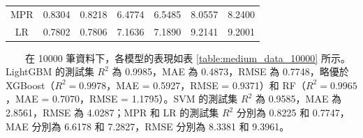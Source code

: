 \documentclass[12pt,a4paper]{article}
\begin{document}
\begin{enumerate}
\begin{enumerate}[label=\arabic*.]
\begin{enumerate}[label=3-2-\arabic*.]
\begin{enumerate}[label=\Alph*.]
\begin{table}[H]
\begin{tabular}{|c|c|c|c|c|c|c|}
                                MPR & 0.8304 & 0.8218 & 6.4774 & 6.5485 & 8.0557 & 8.2400 \\
                                LR & 0.7802 & 0.7806 & 7.1636 & 7.1890 & 9.2141 & 9.2001 \\
                                \hline
                            \end{tabular}
                        \end{table}
                    　　在 10000 筆資料下，各模型的表現如表 \ref{table:medium_data_10000} 所示。LightGBM 的測試集 \( R^2 \) 為 0.9985，MAE 為 0.4873，RMSE 為 0.7748，略優於 XGBoost（\( R^2 = 0.9978 \)，MAE = 0.5927，RMSE = 0.9371）和 RF（\( R^2 = 0.9965 \)，MAE = 0.7070，RMSE = 1.1795）。SVM 的測試集 \( R^2 \) 為 0.9585，MAE 為 2.8561，RMSE 為 4.0287；MPR 和 LR 的測試集 \( R^2 \) 分別為 0.8225 和 0.7747，MAE 分別為 6.6178 和 7.2827，RMSE 分別為 8.3381 和 9.3961。\\


\end{enumerate}
\end{enumerate}
\end{enumerate}
\end{enumerate}
\end{document}

